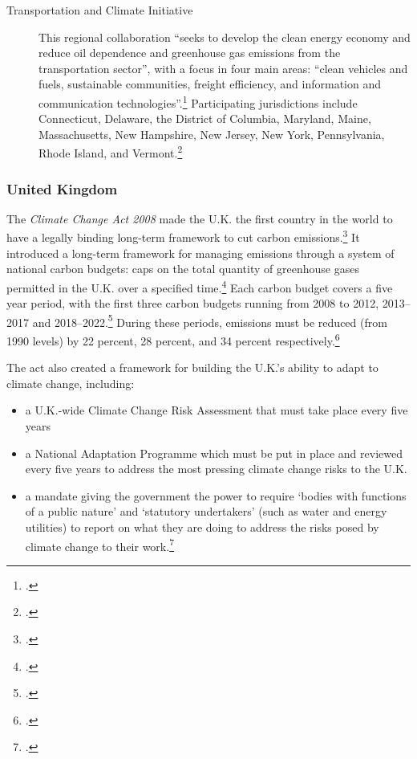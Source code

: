 \begin{description}
	\item[Transportation and Climate Initiative] This regional collaboration ``seeks to develop the clean energy economy and reduce oil dependence and greenhouse gas emissions from the transportation sector'', with a focus in four main areas: ``clean vehicles and fuels, sustainable communities, freight efficiency, and information and communication technologies''.\footcite[][]{TranspoClimate} Participating jurisdictions include Connecticut, Delaware, the District of Columbia, Maryland, Maine, Massachusetts, New Hampshire, New Jersey, New York, Pennsylvania, Rhode Island, and Vermont.\footcite[][]{GeorgetownOnTC}
\end{description}



	\subsubsection{United Kingdom}



The \emph{Climate Change Act 2008} made the U.K. the first country in the world to have a legally binding long-term framework to cut carbon emissions.\footcite[][]{ClimateConvention2009}
It introduced a long-term framework for managing emissions through a system of national carbon budgets: caps on the total quantity of greenhouse gases permitted in the U.K. over a specified time.\footcite[][]{ClimateConvention2009}
Each carbon budget covers a five year period, with the first three carbon budgets running from 2008 to 2012, 2013--2017 and 2018--2022.\footcite[][]{ClimateConvention2009}
During these periods, emissions must be reduced (from 1990 levels) by 22 percent, 28 percent, and 34 percent respectively.\footcite[][]{ClimateConvention2009}



The act also created a framework for building the U.K.'s ability to adapt to climate change, including:
\begin{itemize}
	\item a U.K.-wide Climate Change Risk Assessment that must take place every five years
	\item a National Adaptation Programme which must be put in place and reviewed every five years to address the most pressing climate change risks to the U.K.
	\item a mandate giving the government the power to require `bodies with functions of a public nature' and `statutory undertakers' (such as water and energy utilities) to report on what they are doing to address the risks posed by climate change to their work.\footcite[][]{ClimateConvention2009}
\end{itemize}


